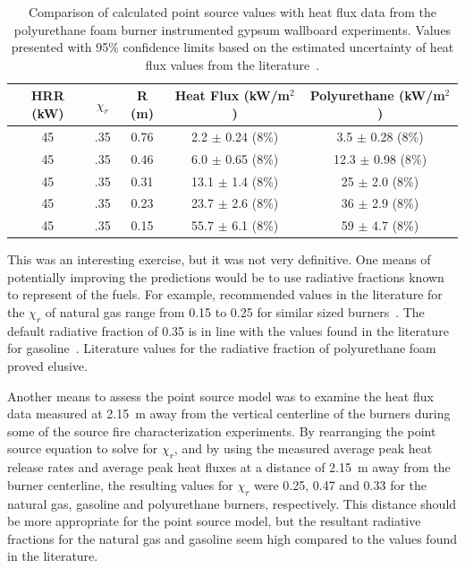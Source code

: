 \documentclass[twoside]{uocthesis}
\begin{document}
{\begin{table}
	\centering
	\footnotesize
	\begin{tabular}{|c|c|c|c|c|}
	\hline
		HRR (kW) &   $\chi_r$   & R (m)	     & Heat Flux (kW/m$^2$)     &  Polyurethane (kW/m$^2$)    	\\ \hline 
		45       &   .35 		& 0.76 	     & 2.2 $\pm$ 0.24 (8\%) 	&  3.5 $\pm$ 0.28 (8\%) 	   	 \\
		45       &   .35    	& 0.46	     & 6.0 $\pm$ 0.65 (8\%) 	&  12.3 $\pm$ 0.98 (8\%)  	     \\
		45       &   .35 		& 0.31	     & 13.1 $\pm$ 1.4 (8\%) 	&  25 $\pm$ 2.0 (8\%)   	      \\
        45       &   .35 		& 0.23	     & 23.7 $\pm$ 2.6 (8\%) 	&  36 $\pm$ 2.9 (8\%)		      \\
        45       &   .35 		& 0.15	     & 55.7 $\pm$ 6.1 (8\%) 	&  59 $\pm$ 4.7 (8\%)   	       \\
	\hline
	\end{tabular}
	\caption[Comparison of calculated point source values (HRR = 45~kW) with heat flux data from the instrumented gypsum wallboard experiments.]{Comparison of calculated point source values with heat flux data from the polyurethane foam burner instrumented gypsum wallboard experiments. Values presented with 95\% confidence limits based on the estimated uncertainty of heat flux values from the literature~\cite{Bryant:2003,Pitts:2006}.}
	\label{tab:Point_Source_HFPUF}
\end{table}

This was an interesting exercise, but it was not very definitive.  One means of potentially improving the predictions would be to use radiative fractions known to represent of the fuels. For example, recommended values in the literature for the $\chi_r$ of natural gas range from 0.15 to 0.25 for similar sized burners~\cite{Hostikka:3,McCaffrey:1982}.  The default radiative fraction of 0.35 is in line with the values found in the literature for gasoline~\cite{Hamins:1991,McGrattan:2000}.  Literature values for the radiative fraction of polyurethane foam proved elusive. 

Another means to assess the point source model was to examine the heat flux data measured at 2.15~m away from the vertical centerline of the burners during some of the source fire characterization experiments. By rearranging the point source equation to solve for $\chi_r$, and by using the measured average peak heat release rates and average peak heat fluxes at a distance of 2.15~m away from the burner centerline, the resulting values for $\chi_r$ were 0.25, 0.47 and 0.33 for the natural gas, gasoline and polyurethane burners, respectively.  This distance should be more appropriate for the point source model, but the resultant radiative fractions for the natural gas and gasoline seem high compared to the values found in the literature.  

}
\end{document}
